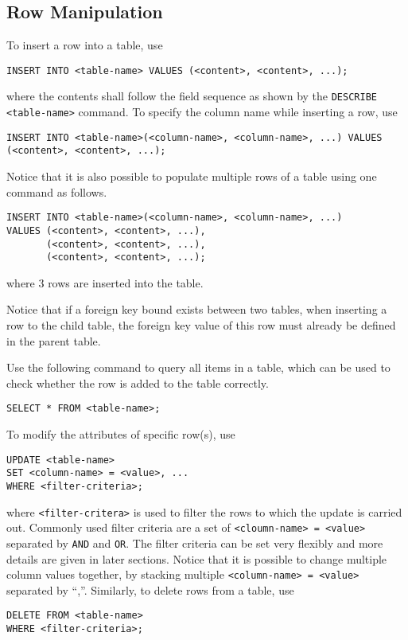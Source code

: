 \subsection{Row Manipulation}

To insert a row into a table, use
\begin{lstlisting}
INSERT INTO <table-name> VALUES (<content>, <content>, ...);
\end{lstlisting}
where the contents shall follow the field sequence as shown by the \verb|DESCRIBE <table-name>| command. To specify the column name while inserting a row, use
\begin{lstlisting}
INSERT INTO <table-name>(<column-name>, <column-name>, ...) VALUES (<content>, <content>, ...);
\end{lstlisting}
Notice that it is also possible to populate multiple rows of a table using one command as follows.
\begin{lstlisting}
INSERT INTO <table-name>(<column-name>, <column-name>, ...)
VALUES (<content>, <content>, ...),
       (<content>, <content>, ...),
       (<content>, <content>, ...);
\end{lstlisting}
where 3 rows are inserted into the table.

Notice that if a foreign key bound exists between two tables, when inserting a row to the child table, the foreign key value of this row must already be defined in the parent table.

Use the following command to query all items in a table, which can be used to check whether the row is added to the table correctly.
\begin{lstlisting}
SELECT * FROM <table-name>;
\end{lstlisting}

To modify the attributes of specific row(s), use
\begin{lstlisting}
UPDATE <table-name>
SET <column-name> = <value>, ...
WHERE <filter-criteria>;
\end{lstlisting}
where \verb|<filter-critera>| is used to filter the rows to which the update is carried out. Commonly used filter criteria are a set of \verb|<cloumn-name> = <value>| separated by \verb|AND| and \verb|OR|. The filter criteria can be set very flexibly and more details are given in later sections. Notice that it is possible to change multiple column values together, by stacking multiple \verb|<column-name> = <value>| separated by ``,''. Similarly, to delete rows from a table, use
\begin{lstlisting}
DELETE FROM <table-name>
WHERE <filter-criteria>;
\end{lstlisting}

